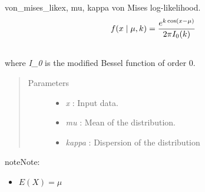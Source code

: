 \hypertarget{pymc.distributions.von_mises_like}{}\begin{funcdesc}{von\_mises\_like}{x, mu, kappa}
von Mises log-likelihood.
\begin{gather}
\begin{split}f(x \mid \mu, k) = \frac{e^{k \cos(x - \mu)}}{2 \pi I_0(k)}\end{split}\notag\\\begin{split}\end{split}\notag
\end{gather}
where \emph{I\_0} is the modified Bessel function of order 0.
\begin{quote}\begin{description}
\item[Parameters] \leavevmode\begin{itemize}
\item {} 
\emph{x} : Input data.

\item {} 
\emph{mu} : Mean of the distribution.

\item {} 
\emph{kappa} : Dispersion of the distribution

\end{itemize}

\end{description}\end{quote}

\begin{notice}{note}{Note:}\begin{itemize}
\item {} 
$E(X) = \mu$

\end{itemize}
\end{notice}
\end{funcdesc}

